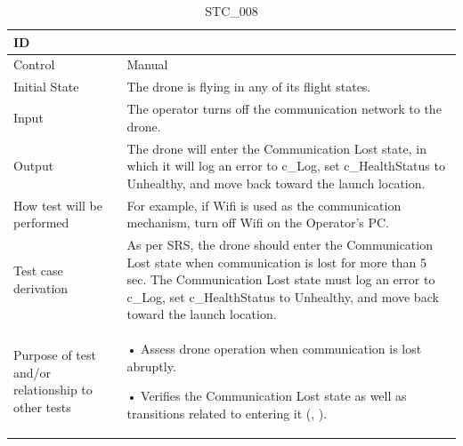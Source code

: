 \documentclass[12pt, titlepage]{article}
\begin{document}
\begin{table}[!h]
\begin{center}
\caption {STC\_008}
\label{tab:STC_008}
\begin{tabular}{ | m{3.2cm} | m{12.2cm} | } 
\hline
ID & \nameref{tab:STC_008} \\ 
\hline
Control & Manual \\ 
\hline
Initial State &  The drone is flying in any of its flight states. \\ 
\hline
Input & The operator turns off the communication network to the drone. \\ 
\hline
Output & The drone will enter the Communication Lost state, in which it will log an error to c_Log, set c\_HealthStatus to Unhealthy, and move back toward the launch location. \\ 
\hline
How test will be performed & For example, if Wifi is used as the communication mechanism, turn off Wifi on the Operator's PC. \\ 
\hline
Test case derivation & As per SRS, the drone should enter the Communication Lost state when communication is lost for more than 5 sec. The Communication Lost state must log an error to c_Log, set c\_HealthStatus to Unhealthy, and move back toward the launch location. \\ 
\hline
Purpose of test and/or relationship to other tests & 
• Assess drone operation when communication is lost abruptly.

• Verifies the Communication Lost state as well as transitions related to entering it (\nameref{STA_010}, \nameref{TRANS_010}).  
\\ 
\hline
\end{tabular}
\end{center}
\end{table}
\end{document}
